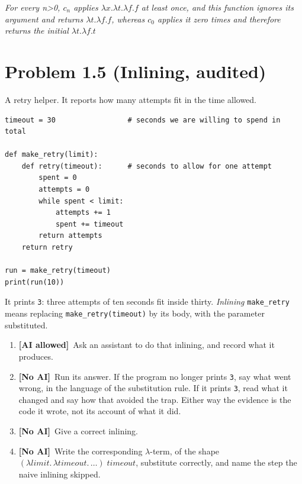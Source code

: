 \documentclass[11pt]{article}
\newenvironment{reasoning}[1][Justification]%
  {\par\noindent{\bfseries\color{solution}#1.}%
   \begin{mdframed}[style=reasonbox]\color{solution}}%
  {\end{mdframed}}
\newcommand{\noai}{\textcolor{BrickRed}{\textbf{[No AI]}}}
\newcommand{\aiallowed}{\textcolor{RoyalPurple}{\textbf{[AI allowed]}}}
\begin{document}
\begin{reasoning}[Explanation for (c)]
  \emph{For every n>0, $c_n$ applies $\lambda x.\lambda t.\lambda f.f$ at least once, and this function ignores its argument 
  and returns $\lambda t.\lambda f.f$, whereas $c_0$ applies it zero times and therefore returns the initial $\lambda t.\lambda f.t$}
\end{reasoning}

\clearpage
\section*{Problem 1.5 (Inlining, audited)}

A retry helper. It reports how many attempts fit in the time allowed.

\begin{verbatim}
timeout = 30                 # seconds we are willing to spend in total

def make_retry(limit):
    def retry(timeout):      # seconds to allow for one attempt
        spent = 0
        attempts = 0
        while spent < limit:
            attempts += 1
            spent += timeout
        return attempts
    return retry

run = make_retry(timeout)
print(run(10))
\end{verbatim}

\noindent
It prints \texttt{3}: three attempts of ten seconds fit inside thirty.
\emph{Inlining} \texttt{make\_retry} means replacing
\texttt{make\_retry(timeout)} by its body, with the parameter substituted.

\begin{enumerate}[label=(\alph*)]
  \item \aiallowed\ Ask an assistant to do that inlining, and record what it
    produces.
  \item \noai\ Run its answer. If the program no longer prints \texttt{3}, say
    what went wrong, in the language of the substitution rule. If it prints
    \texttt{3}, read what it changed and say how that avoided the trap. Either
    way the evidence is the code it wrote, not its account of what it did.
  \item \noai\ Give a correct inlining.
  \item \noai\ Write the corresponding $\lambda$-term, of the shape
    $(\lambda \mathit{limit}.\, \lambda \mathit{timeout}.\, \ldots)\;
    \mathit{timeout}$, substitute correctly, and name the step the naive
    inlining skipped.
\end{enumerate}
\end{document}
